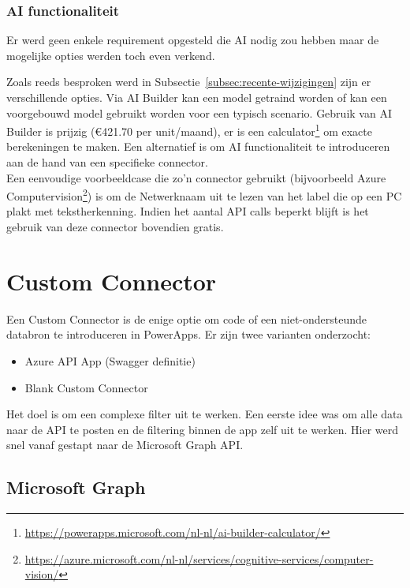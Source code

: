 \subsubsection{AI functionaliteit}

Er werd geen enkele requirement opgesteld die AI nodig zou hebben maar de mogelijke opties werden toch even verkend.

Zoals reeds besproken werd in Subsectie~\ref{subsec:recente-wijzigingen} zijn er verschillende opties. Via AI Builder kan een model getraind worden of kan een voorgebouwd model gebruikt worden voor een typisch scenario. Gebruik van AI Builder is prijzig (\euro 421.70 per unit/maand), er is een calculator\footnote{\url{https://powerapps.microsoft.com/nl-nl/ai-builder-calculator/}} om exacte berekeningen te maken. Een alternatief is om AI functionaliteit te introduceren aan de hand van een specifieke connector.\\
Een eenvoudige voorbeeldcase die zo'n connector gebruikt (bijvoorbeeld Azure Computervision\footnote{\url{https://azure.microsoft.com/nl-nl/services/cognitive-services/computer-vision/}}) is om de Netwerknaam uit te lezen van het label die op een PC plakt met tekstherkenning. Indien het aantal API calls beperkt blijft is het gebruik van deze connector bovendien gratis.

\section{Custom Connector}
\label{sec:custom-connector}

Een Custom Connector is de enige optie om code of een niet-ondersteunde databron te introduceren in PowerApps. Er zijn twee varianten onderzocht:
\begin{itemize}
    \item Azure API App (Swagger definitie)
    \item Blank Custom Connector
\end{itemize}
Het doel is om een complexe filter uit te werken. Een eerste idee was om alle data naar de API te posten en de filtering binnen de app zelf uit te werken. Hier werd snel vanaf gestapt naar de Microsoft Graph API. %


\subsection{Microsoft Graph}
\label{subsec:ms-graph}

